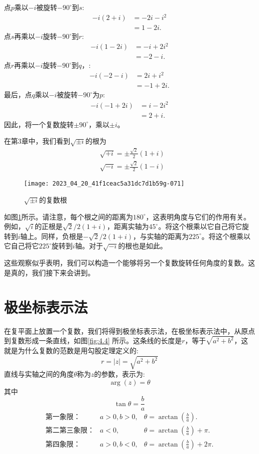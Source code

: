 点$p$乘以$-i$被旋转$-90^{\circ}$到$s$:
$$
    \begin{aligned}
        -i(2+i) & =-2 i-i^{2} \\
                & =1-2 i .
    \end{aligned}
$$
点$s$再乘以$-i$旋转$-90^{\circ}$到$r$:
$$
    \begin{aligned}
        -i(1-2 i) & =-i+2 i^{2} \\
                  & =-2-i .
    \end{aligned}
$$
点$r$再乘以$-i$旋转$-90^{\circ}$到$q$，:
$$
    \begin{aligned}
        -i(-2-i) & =2 i+i^{2} \\
                 & =-1+2 i .
    \end{aligned}
$$
最后，点$q$乘以$-i$被旋转$-90^{\circ}$为$p$:
$$
    \begin{aligned}
        -i(-1+2 i) & =i-2 i^{2} \\
                   & =2+i .
    \end{aligned}
$$
因此，将一个复数旋转$\pm 90^{\circ}$，乘以$\pm i$。

在第3章中，我们看到$\sqrt{\pm i}$的根为
$$
    \begin{aligned}
         & \sqrt{+i}=\pm \frac{\sqrt{2}}{2}(1+i) \\
         & \sqrt{-i}=\pm \frac{\sqrt{2}}{2}(1-i)
    \end{aligned}
$$
\begin{figure}[htbp]
    \centering
    \texttt{[image: 2023\_04\_20\_41f1ceac5a31dc7d1b59g-071]}
    \caption[short]{$\sqrt{ \pm i}$的复数根}
    \label{fig:4.3}
\end{figure}
如图\ref{fig:4.3}所示。请注意，每个根之间的距离为$180^{\circ}$，这表明角度与它们的作用有关。例如，$\sqrt{i}$的正根是$\sqrt{2} / 2(1+i)$，距离实轴为$45^{\circ}$。将这个根乘以它自己将它旋转到$i$轴上。同样，负根是$-\sqrt{2} / 2(1+i)$，与实轴的距离为$225^{\circ}$。将这个根乘以它自己将它$225^{\circ}$旋转到$i$轴。对于$\sqrt{-i}$的根也是如此。


这些观察似乎表明，我们可以构造一个能够将另一个复数旋转任何角度的复数。这是真的，我们接下来会讲到。

\section{极坐标表示法}
在复平面上放置一个复数，我们将得到极坐标表示法，在极坐标表示法中，从原点到复数形成一条直线，如图\ref{fig:4.4} 所示。这条线的长度是$r$，等于$\sqrt{a^{2}+b^{2}}$，这就是为什么复数的范数是用勾股定理定义的:
$$
    r=|z|=\sqrt{a^{2}+b^{2}}
$$
直线与实轴之间的角度$\theta$称为$z$的参数，表示为:
$$
    \arg (z)=\theta
$$
其中
$$
    \tan \theta=\frac{b}{a}
$$
\begin{align*}
    \text{第一象限：}        & a>0, b>0, & \theta=\arctan \left(\frac{b}{a}\right).       \\
    \text{第二第三象限：} & a<0,      &
    \theta=\arctan \left(\frac{b}{a}\right) +\pi.                                              \\
    \text{第四象限：}        & a>0, b<0, & \theta=\arctan \left(\frac{b}{a}\right)+2 \pi.
\end{align*}

